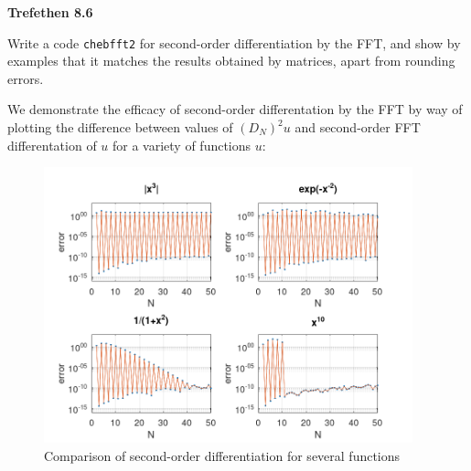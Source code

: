 \textbf{Trefethen 8.6}

Write a code \texttt{chebfft2} for second-order differentiation by the FFT, and show by examples that it matches the
results obtained by matrices, apart from rounding errors.

\begin{solution}
  We demonstrate the efficacy of second-order differentation by the FFT by way of plotting the difference between values
  of $(D_N)^2 u$ and second-order FFT differentation of $u$ for a variety of functions $u$:

  \begin{figure}[h]
    \centering
    \includegraphics*[width=0.95\textwidth]{problem_8.png}
    \caption{Comparison of second-order differentiation for several functions}\label{fig:cheb_fft2_diff}
  \end{figure}

  \ \\
  \vfill
\end{solution}